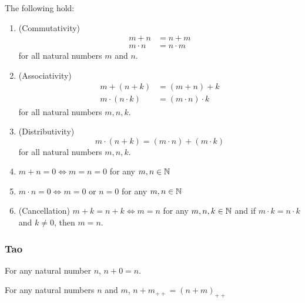 \documentclass[12pt]{article}
\begin{document}
\begin{thm} \label{thm:N:properties}
    The following hold:
    \begin{enumerate}[label=(\alph*)]
        \item\label{thm:N:properties:commutativity} (Commutativity)
        \begin{align*}
            m + n &= n + m \\
            m \cdot n &= n \cdot m
        \end{align*}
        for all natural numbers $m$ and $n$.

        \item\label{thm:N:properties:associativity} (Associativity)
        \begin{align*}
            m + (n + k) &= (m + n) + k \\
            m \cdot (n \cdot k) &= (m \cdot n) \cdot k
        \end{align*}
        for all natural numbers $m, n, k$.

        \item\label{thm:N:distributivity} (Distributivity) \[
            m \cdot (n + k) = (m \cdot n) + (m \cdot k)
        \] for all natural numbers $m, n, k$.
        \item\label{thm:N:m+n=0=>m=n=0} $m + n = 0 \iff m = n = 0$ for any $m, n \in \mathbb{N}$

        \item\label{thm:N:m.n=0=>m=0|n=0} $m \cdot n = 0 \iff m = 0$ or $n = 0$ for any $m, n \in \mathbb{N}$

        \item\label{thm:N:cancellation} (Cancellation) $m + k = n + k \iff m = n$ for any $m, n, k \in \mathbb{N}$ and if $m \cdot k = n \cdot k$ and $k \neq 0$, then $m = n$.
    \end{enumerate}
\end{thm}

\subsubsection{Tao}

\begin{lem} \label{thm:N:Tao:n+0=n}
For any natural number $n$, $n+0=n$.
\end{lem}

\begin{lem} \label{thm:N:Tao:n+S(m)=S(n+m)}
For any natural numbers $n$ and $m$, $n+m_{++}=(n+m)_{++}$
\end{lem}
\end{document}
